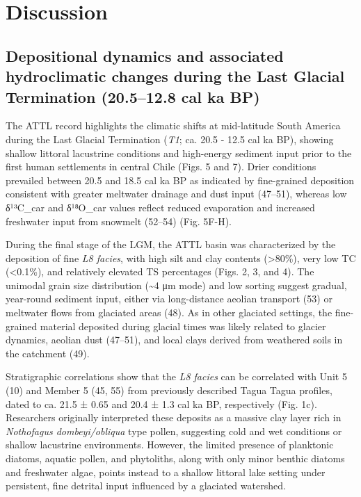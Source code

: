 \documentclass[
]{article}
\begin{document}
\section{Discussion}\label{discussion}

\subsection{Depositional dynamics and associated hydroclimatic changes
during the Last Glacial Termination (20.5--12.8 cal ka
BP)}\label{depositional-dynamics-and-associated-hydroclimatic-changes-during-the-last-glacial-termination-20.512.8-cal-ka-bp}

The ATTL record highlights the climatic shifts at mid-latitude South
America during the Last Glacial Termination (\emph{T1}; ca. 20.5 - 12.5
cal ka BP), showing shallow littoral lacustrine conditions and
high-energy sediment input prior to the first human settlements in
central Chile (Figs. 5 and 7). Drier conditions prevailed between 20.5
and 18.5 cal ka BP as indicated by fine-grained deposition consistent
with greater meltwater drainage and dust input (47--51), whereas low
δ¹³C\_car and δ¹⁸O\_car values reflect reduced evaporation and increased
freshwater input from snowmelt (52--54) (Fig. 5F-H).

During the final stage of the LGM, the ATTL basin was characterized by
the deposition of fine \emph{L8 facies}, with high silt and clay
contents (\textgreater80\%), very low TC (\textless0.1\%), and
relatively elevated TS percentages (Figs. 2, 3, and 4). The unimodal
grain size distribution (\textasciitilde4 μm mode) and low sorting
suggest gradual, year-round sediment input, either via long-distance
aeolian transport (53) or meltwater flows from glaciated areas (48). As
in other glaciated settings, the fine-grained material deposited during
glacial times was likely related to glacier dynamics, aeolian dust
(47--51), and local clays derived from weathered soils in the catchment
(49).

Stratigraphic correlations show that the \emph{L8 facies} can be
correlated with Unit 5 (10) and Member 5 (45, 55) from previously
described Tagua Tagua profiles, dated to ca. 21.5 ± 0.65 and 20.4 ± 1.3
cal ka BP, respectively (Fig. 1c). Researchers originally interpreted
these deposits as a massive clay layer rich in \emph{Nothofagus
dombeyi/obliqua} type pollen, suggesting cold and wet conditions or
shallow lacustrine environments. However, the limited presence of
planktonic diatoms, aquatic pollen, and phytoliths, along with only
minor benthic diatoms and freshwater algae, points instead to a shallow
littoral lake setting under persistent, fine detrital input influenced
by a glaciated watershed.
\end{document}
